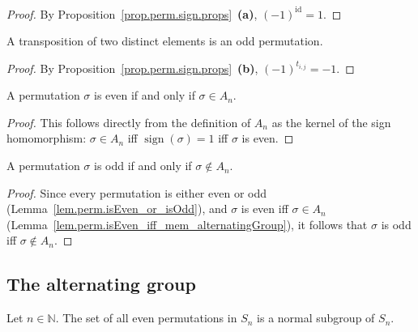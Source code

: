 \begin{proof}
\leanok
By Proposition~\ref{prop.perm.sign.props}~\textbf{(a)},
$(-1)^{\operatorname{id}} = 1$.
\end{proof}

\begin{lemma}
\label{lem.perm.isOdd_swap}
\leanhelper
\leanok
A transposition of two distinct elements is an odd permutation.
\end{lemma}

\begin{proof}
\leanok
By Proposition~\ref{prop.perm.sign.props}~\textbf{(b)},
$(-1)^{t_{i,j}} = -1$.
\end{proof}

\begin{lemma}
\label{lem.perm.isEven_iff_mem_alternatingGroup}
\leanhelper
\leanok
A permutation $\sigma$ is even if and only if $\sigma \in A_n$.
\end{lemma}

\begin{proof}
\leanok
This follows directly from the definition of $A_n$ as the kernel of the sign homomorphism:
$\sigma \in A_n$ iff $\operatorname{sign}(\sigma) = 1$ iff $\sigma$ is even.
\end{proof}

\begin{lemma}
\label{lem.perm.isOdd_iff_not_mem_alternatingGroup}
\leanhelper
\leanok
A permutation $\sigma$ is odd if and only if $\sigma \notin A_n$.
\end{lemma}

\begin{proof}
\leanok
Since every permutation is either even or odd
(Lemma~\ref{lem.perm.isEven_or_isOdd}), and $\sigma$ is even iff
$\sigma \in A_n$ (Lemma~\ref{lem.perm.isEven_iff_mem_alternatingGroup}),
it follows that $\sigma$ is odd iff $\sigma \notin A_n$.
\end{proof}

\subsection{The alternating group}

\begin{corollary}
\label{cor.perm.altgp}
\leantarget
\leanok
Let $n \in \mathbb{N}$. The set of all even permutations in $S_n$ is a
normal subgroup of $S_n$.
\end{corollary}

